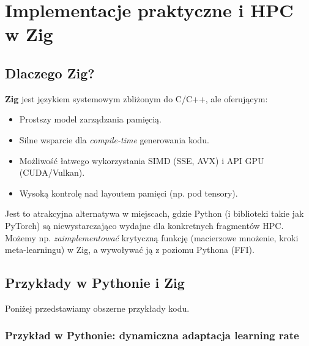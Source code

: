 \documentclass[12pt,a4paper]{article}
\begin{document}
\section{Implementacje praktyczne i HPC w Zig}

\subsection{Dlaczego Zig?}

\textbf{Zig} jest językiem systemowym zbliżonym do C/C++, ale oferującym:
\begin{itemize}
    \item Prostszy model zarządzania pamięcią.
    \item Silne wsparcie dla \emph{compile-time} generowania kodu.
    \item Możliwość łatwego wykorzystania SIMD (SSE, AVX) i API GPU (CUDA/Vulkan).
    \item Wysoką kontrolę nad layoutem pamięci (np. pod tensory).
\end{itemize}
Jest to atrakcyjna alternatywa w miejscach, gdzie Python (i biblioteki takie jak PyTorch) są niewystarczająco wydajne dla konkretnych fragmentów HPC. Możemy np. \emph{zaimplementować} krytyczną funkcję (macierzowe mnożenie, kroki meta-learningu) w Zig, a wywoływać ją z poziomu Pythona (FFI).

\subsection{Przykłady w Pythonie i Zig}

Poniżej przedstawiamy obszerne przykłady kodu.

\subsubsection{Przykład w Pythonie: dynamiczna adaptacja learning rate}
\end{document}
